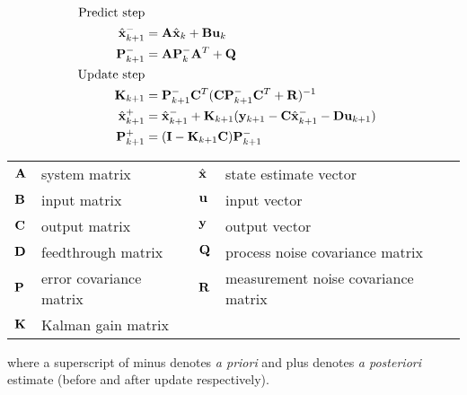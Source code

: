 \begin{theorem}
  \label{thm:kalman_filter}
  \begin{align}
    \text{Predict step} \nonumber \\
    \hat{\mathbf{x}}_{k+1}^- &= \mathbf{A}\hat{\mathbf{x}}_k + \mathbf{B} \mathbf{u}_k \\
    \mathbf{P}_{k+1}^- &= \mathbf{A} \mathbf{P}_k^- \mathbf{A}^T + \mathbf{Q} \\
    \text{Update step} \nonumber \\
    \mathbf{K}_{k+1} &=
      \mathbf{P}_{k+1}^- \mathbf{C}^T (\mathbf{C}\mathbf{P}_{k+1}^- \mathbf{C}^T +
      \mathbf{R})^{-1} \\
    \hat{\mathbf{x}}_{k+1}^+ &=
      \hat{\mathbf{x}}_{k+1}^- + \mathbf{K}_{k+1}(\mathbf{y}_{k+1} -
      \mathbf{C} \hat{\mathbf{x}}_{k+1}^- - \mathbf{D}\mathbf{u}_{k+1}) \\
    \mathbf{P}_{k+1}^+ &= (\mathbf{I} - \mathbf{K}_{k+1}\mathbf{C})\mathbf{P}_{k+1}^-
  \end{align}
  \begin{figurekey}
    \begin{tabular}{llll}
      $\mathbf{A}$ & system matrix & $\hat{\mathbf{x}}$ & state estimate vector \\
      $\mathbf{B}$ & input matrix       & $\mathbf{u}$ & input vector \\
      $\mathbf{C}$ & output matrix      & $\mathbf{y}$ & output vector \\
      $\mathbf{D}$ & feedthrough matrix & $\mathbf{Q}$ & process noise covariance matrix \\
      $\mathbf{P}$ & error covariance matrix & $\mathbf{R}$ & measurement noise covariance matrix \\
      $\mathbf{K}$ & Kalman gain matrix & &
    \end{tabular}
  \end{figurekey}

  where a superscript of minus denotes \textit{a priori} and plus denotes
  \textit{a posteriori} estimate (before and after update respectively).
\end{theorem}

